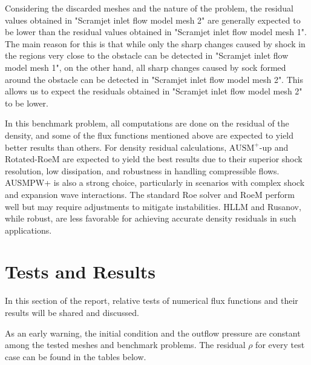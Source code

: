 \documentclass[a4paper, 12pt]{article}
\begin{document}
Considering the discarded meshes and the nature of the problem, the residual values obtained in "Scramjet inlet flow model mesh 2" are generally expected to be lower than the residual values obtained in "Scramjet inlet flow model mesh 1". The main reason for this is that while only the sharp changes caused by shock in the regions very close to the obstacle can be detected in "Scramjet inlet flow model mesh 1", on the other hand, all sharp changes caused by sock formed around the obstacle can be detected in "Scramjet inlet flow model mesh 2". This allows us to expect the residuals obtained in "Scramjet inlet flow model mesh 2" to be lower.\\\par
In this benchmark problem, all computations are done on the residual of the density, and some of the flux functions mentioned above are expected to yield better results than others. For density residual calculations, $\text{AUSM}^+\text{-up}$ and Rotated-RoeM are expected to yield the best results due to their superior shock resolution, low dissipation, and robustness in handling compressible flows. AUSMPW+ is also a strong choice, particularly in scenarios with complex shock and expansion wave interactions. The standard Roe solver and RoeM perform well but may require adjustments to mitigate instabilities. HLLM and Rusanov, while robust, are less favorable for achieving accurate density residuals in such applications.

\section{Tests and Results}
In this section of the report, relative tests of numerical flux functions and their results will be shared and discussed.\\\par

As an early warning, the initial condition and the outflow pressure are constant among the tested meshes and benchmark problems. The residual $\rho$ for every test case can be found in the tables below.
\end{document}
